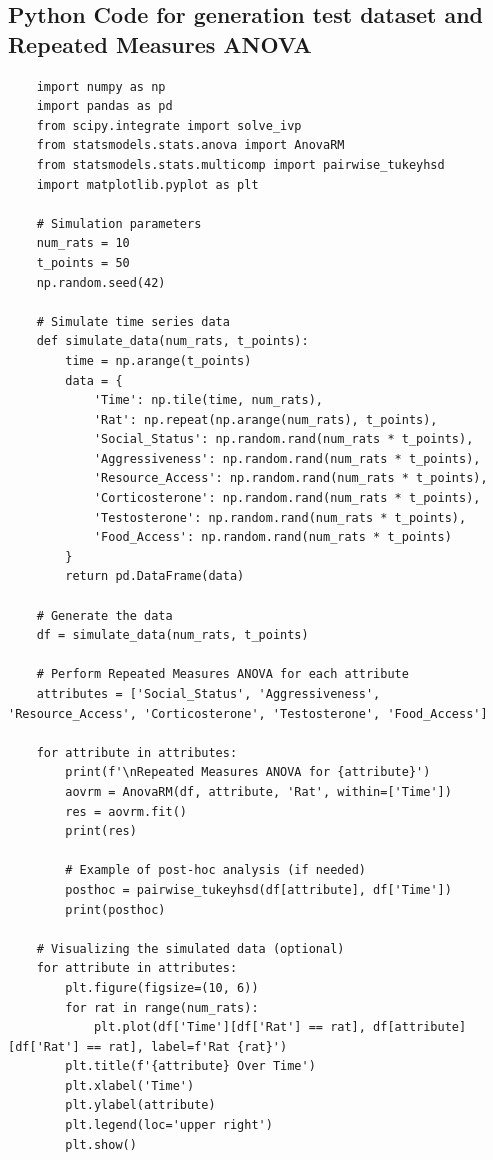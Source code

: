 \documentclass[english, a4paper, 11pt]{article}
\begin{document}
\subsection*{Python Code for generation test dataset and Repeated Measures ANOVA}

\begin{lstlisting}
    import numpy as np
    import pandas as pd
    from scipy.integrate import solve_ivp
    from statsmodels.stats.anova import AnovaRM
    from statsmodels.stats.multicomp import pairwise_tukeyhsd
    import matplotlib.pyplot as plt
    
    # Simulation parameters
    num_rats = 10
    t_points = 50
    np.random.seed(42)
    
    # Simulate time series data
    def simulate_data(num_rats, t_points):
        time = np.arange(t_points)
        data = {
            'Time': np.tile(time, num_rats),
            'Rat': np.repeat(np.arange(num_rats), t_points),
            'Social_Status': np.random.rand(num_rats * t_points),
            'Aggressiveness': np.random.rand(num_rats * t_points),
            'Resource_Access': np.random.rand(num_rats * t_points),
            'Corticosterone': np.random.rand(num_rats * t_points),
            'Testosterone': np.random.rand(num_rats * t_points),
            'Food_Access': np.random.rand(num_rats * t_points)
        }
        return pd.DataFrame(data)
    
    # Generate the data
    df = simulate_data(num_rats, t_points)
    
    # Perform Repeated Measures ANOVA for each attribute
    attributes = ['Social_Status', 'Aggressiveness', 'Resource_Access', 'Corticosterone', 'Testosterone', 'Food_Access']
    
    for attribute in attributes:
        print(f'\nRepeated Measures ANOVA for {attribute}')
        aovrm = AnovaRM(df, attribute, 'Rat', within=['Time'])
        res = aovrm.fit()
        print(res)
    
        # Example of post-hoc analysis (if needed)
        posthoc = pairwise_tukeyhsd(df[attribute], df['Time'])
        print(posthoc)
    
    # Visualizing the simulated data (optional)
    for attribute in attributes:
        plt.figure(figsize=(10, 6))
        for rat in range(num_rats):
            plt.plot(df['Time'][df['Rat'] == rat], df[attribute][df['Rat'] == rat], label=f'Rat {rat}')
        plt.title(f'{attribute} Over Time')
        plt.xlabel('Time')
        plt.ylabel(attribute)
        plt.legend(loc='upper right')
        plt.show()
    
\end{lstlisting}
\end{document}
